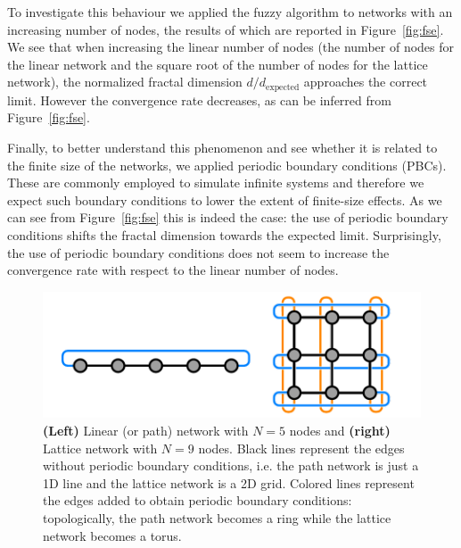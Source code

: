 \documentclass[9pt,onecolumn,twoside]{pnas-new}
\begin{document}
To investigate this behaviour we applied the fuzzy algorithm to networks with an increasing number of nodes, the results of which are reported in Figure~\ref{fig:fse}. We see that when increasing the linear number of nodes (the number of nodes for the linear network and the square root of the number of nodes for the lattice network), the normalized fractal dimension $d/d_\text{expected}$ approaches the correct limit. However the convergence rate decreases, as can be inferred from Figure~\ref{fig:fse}.

Finally, to better understand this phenomenon and see whether it is related to the finite size of the networks, we applied periodic boundary conditions (PBCs). These are commonly employed to simulate infinite systems \cite{kittel2004} and therefore we expect such boundary conditions to lower the extent of finite-size effects. As we can see from Figure~\ref{fig:fse} this is indeed the case: the use of periodic boundary conditions shifts the fractal dimension towards the expected limit. Surprisingly, the use of periodic boundary conditions does not seem to increase the convergence rate with respect to the linear number of nodes.

\begin{figure}[h]
    \centering
    \includegraphics[width=0.5\columnwidth]{images/path_lattice.pdf}
    \caption{\textbf{(Left)} Linear (or path) network with $N = 5$ nodes and \textbf{(right)} Lattice network with $N=9$ nodes. Black lines represent the edges without periodic boundary conditions, i.e. the path network is just a 1D line and the lattice network is a 2D grid. Colored lines represent the edges added to obtain periodic boundary conditions: topologically, the path network becomes a ring while the lattice network becomes a torus.}
    \label{fig:lattice_and_path}
\end{figure}
\end{document}
